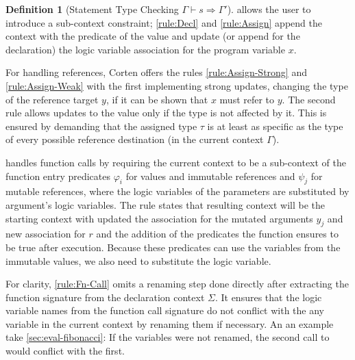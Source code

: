 \documentclass[twoside, english]{sdqthesis}
\theoremstyle{definition}
\newtheorem{definition}[theorem]{Definition}
\begin{document}
\begin{definition}[Statement Type Checking $\Gamma \vdash s \Rightarrow \Gamma'$]
 allows the user to introduce a sub-context constraint; \cref{rule:Decl} and \cref{rule:Assign} append the context with the predicate of the value and update (or append for the declaration) the logic variable association for the program variable $x$. 

For handling references, Corten offers the rules \cref{rule:Assign-Strong} and \cref{rule:Assign-Weak} with the first implementing 
strong updates, changing the type of the reference target $y$, if it can be shown that $x$ must refer to $y$. 
The second rule allows updates to the value only if the type is not affected by it. This is ensured by demanding that the assigned type $\tau$ is at least as specific as the type of every possible reference destination (in the current context $\Gamma$).


 handles function calls by requiring the current context to be a sub-context of the function entry predicates $\varphi_i$ for values and immutable references and $\psi_j$ for mutable references, where the logic variables of the parameters are substituted by argument's logic variables. 
The rule states that resulting context will be the starting context with updated the association for the mutated arguments $y_j$ and new association for $r$ and the addition of the predicates the function ensures to be true after execution. Because these predicates can use the variables from the immutable values, we also need to substitute the logic variable.

For clarity, \cref{rule:Fn-Call} omits a renaming step done directly after extracting the function signature from the declaration context $\Sigma$. It ensures that the logic variable names from the function call signature do not conflict with the any variable in the current context by renaming them if necessary. An an example take \cref{sec:eval-fibonacci}: If the variables were not renamed, the second call to  would conflict with the first.
\end{definition}

\end{document}
